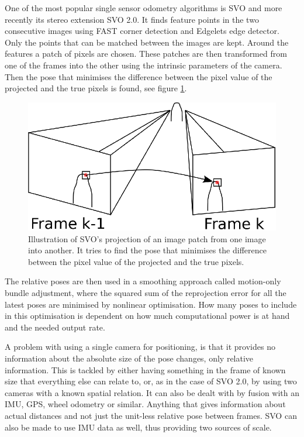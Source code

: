 One of the most popular single sensor odometry algorithms is \gls{SVO}\cite{SVO} and more recently its stereo extension \gls{SVO} 2.0\cite{SVO2}. It finds feature points in the two consecutive images using FAST corner detection\cite{FAST} and Edgelets edge detector\cite{Edgelet}. Only the points that can be matched between the images are kept. Around the features a patch of pixels are chosen. These patches are then transformed from one of the frames into the other using the intrinsic parameters of the camera. Then the pose that minimises the difference between the pixel value of the projected and the true pixels is found, see figure \ref{Fig:SVO}. 

\begin{figure}
    \centering
    \includegraphics[width=0.8\linewidth]{0_Images/3_Background/SVO.eps}
    \caption[Illustration of \gls{SVO}'s reprojection of an image patch.]
    {Illustration of \gls{SVO}'s projection of an image patch from one image into another. It tries to find the pose that minimises the difference between the pixel value of the projected and the true pixels.}
    \label{Fig:SVO}
\end{figure}

The relative poses are then used in a smoothing approach called motion-only bundle adjustment, where the squared sum of the reprojection error for all the latest poses are minimised by nonlinear optimisation. How many poses to include in this optimisation is dependent on how much computational power is at hand and the needed output rate.

A problem with using a single camera for positioning, is that it provides no information about the absolute size of the pose changes, only relative information. This is tackled by either having something in the frame of known size that everything else can relate to, or, as in the case of \gls{SVO} 2.0, by using two cameras with a known spatial relation. It can also be dealt with by fusion with an \gls{IMU}, \gls{GPS}, wheel odometry or similar. Anything that gives information about actual distances and not just the unit-less relative pose between frames. \gls{SVO} can also be made to use \gls{IMU} data as well, thus providing two sources of scale.

